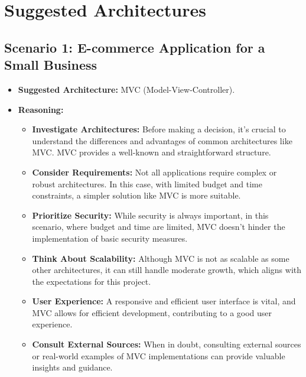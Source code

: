 \section*{Suggested Architectures}

\subsection*{Scenario 1: E-commerce Application for a Small Business}
\begin{itemize}
	\item \textbf{Suggested Architecture:} MVC (Model-View-Controller).
	\item \textbf{Reasoning:}
	\begin{itemize}
		\item \textbf{Investigate Architectures:} Before making a decision, it's crucial to understand the differences and advantages of common architectures like MVC. MVC provides a well-known and straightforward structure.
		\item \textbf{Consider Requirements:} Not all applications require complex or robust architectures. In this case, with limited budget and time constraints, a simpler solution like MVC is more suitable.
		\item \textbf{Prioritize Security:} While security is always important, in this scenario, where budget and time are limited, MVC doesn't hinder the implementation of basic security measures.
		\item \textbf{Think About Scalability:} Although MVC is not as scalable as some other architectures, it can still handle moderate growth, which aligns with the expectations for this project.
		\item \textbf{User Experience:} A responsive and efficient user interface is vital, and MVC allows for efficient development, contributing to a good user experience.
		\item \textbf{Consult External Sources:} When in doubt, consulting external sources or real-world examples of MVC implementations can provide valuable insights and guidance.
	\end{itemize}
\end{itemize}

